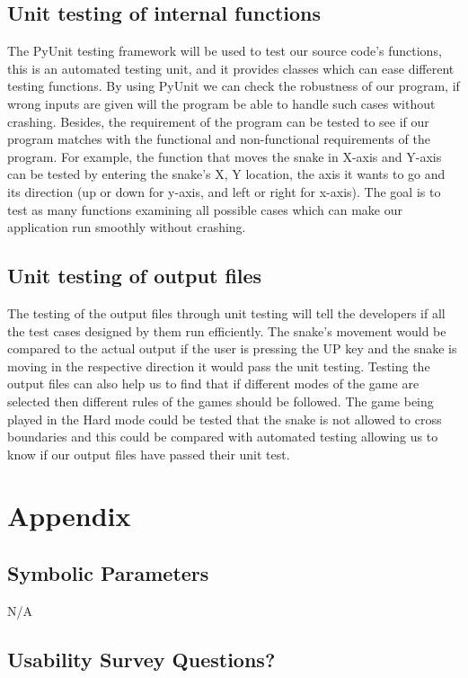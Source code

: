 \documentclass[12pt, titlepage]{article}
\begin{document}
\subsection{Unit testing of internal functions}
The PyUnit testing framework will be used to test our source code's functions, this is an automated testing unit, and it provides classes which can ease different testing functions. By using PyUnit we can check the robustness of our program, if wrong inputs are given will the program be able to handle such cases without crashing. Besides, the requirement of the program can be tested to see if our program matches with the functional and non-functional requirements of the program. For example, the function that moves the snake in X-axis and Y-axis can be tested by entering the snake's X, Y location, the axis it wants to go and its direction (up or down for y-axis, and left or right for x-axis).  The goal is to test as many functions examining all possible cases which can make our application run smoothly without crashing. \subsection{Unit testing of output files}		
The testing of the output files through unit testing will tell the developers if all the test cases designed by them run efficiently. The snake's movement would be compared to the actual output if the user is pressing the UP key and the snake is moving in the respective direction it would pass the unit testing. Testing the output files can also help us to find that if different modes of the game are selected then different rules of the games should be followed. The game being played in the Hard mode could be tested that the snake is not allowed to cross boundaries and this could be compared with automated testing allowing us to know if our output files have passed their unit test.


\newpage

\section{Appendix}

\subsection{Symbolic Parameters}

N/A

\subsection{Usability Survey Questions?}
\end{document}
